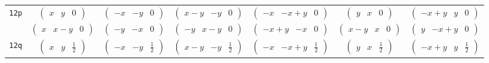 \documentclass[fleqn,9pt,landscape]{jsarticle}
\begin{document}
\begin{center}
\begin{longtable}{ccccccc}
{\tt 12p} & $ \begin{pmatrix} x & y & 0 \end{pmatrix} $ & $ \begin{pmatrix} - x & - y & 0 \end{pmatrix} $ & $ \begin{pmatrix} x - y & - y & 0 \end{pmatrix} $ & $ \begin{pmatrix} - x & - x + y & 0 \end{pmatrix} $ & $ \begin{pmatrix} y & x & 0 \end{pmatrix} $ & $ \begin{pmatrix} - x + y & y & 0 \end{pmatrix} $ \\
& $ \begin{pmatrix} x & x - y & 0 \end{pmatrix} $ & $ \begin{pmatrix} - y & - x & 0 \end{pmatrix} $ & $ \begin{pmatrix} - y & x - y & 0 \end{pmatrix} $ & $ \begin{pmatrix} - x + y & - x & 0 \end{pmatrix} $ & $ \begin{pmatrix} x - y & x & 0 \end{pmatrix} $ & $ \begin{pmatrix} y & - x + y & 0 \end{pmatrix} $ \\ \hline
{\tt 12q} & $ \begin{pmatrix} x & y & \frac{1}{2} \end{pmatrix} $ & $ \begin{pmatrix} - x & - y & \frac{1}{2} \end{pmatrix} $ & $ \begin{pmatrix} x - y & - y & \frac{1}{2} \end{pmatrix} $ & $ \begin{pmatrix} - x & - x + y & \frac{1}{2} \end{pmatrix} $ & $ \begin{pmatrix} y & x & \frac{1}{2} \end{pmatrix} $ & $ \begin{pmatrix} - x + y & y & \frac{1}{2} \end{pmatrix} $ \\

\end{longtable}
\end{center}
\end{document}

